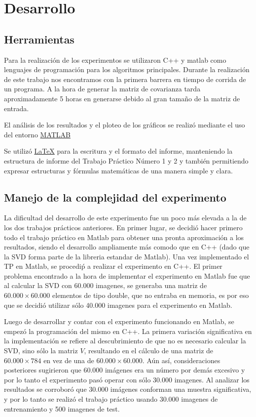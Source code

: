\section{Desarrollo}

\subsection{Herramientas}

Para la realizaci\'on de los experimentos se utilizaron C++ y matlab como lenguajes de
programaci\'on para los algoritmos principales. Durante la realizaci\'on de este trabajo nos encontramos con
la primera barrera en tiempo de corrida de un programa. A la hora de generar la matriz de covarianza tarda
aproximadamente 5 horas en generarse debido al gran tama\~no de la matriz de entrada.

El an\'alisis de los resultados y el ploteo de los gr\'aficos se realiz\'o
mediante el uso del entorno \href{http://www.matlab.com/}{MATLAB}

Se utiliz\'o \href{http://www.latex-project.org/}{\LaTeX} para la escritura y el formato del informe,
manteniendo la estructura de informe del Trabajo Pr\'actico N\'umero 1 y 2 y tambi\'en
permitiendo expresar estructuras y f\'ormulas matem\'aticas de una manera simple y clara.

\subsection{Manejo de la complejidad del experimento}

La dificultad del desarrollo de este experimento fue un poco m\'as elevada a la de los dos
trabajos pr\'acticos anteriores.
En primer lugar, se decidi\'o hacer primero todo el trabajo pr\'actico en Matlab para obtener
una pronta aproximaci\'on a los resultados, siendo el desarrollo ampliamente m\'as comodo que
en C++ (dado que la SVD forma parte de la libreria estandar de Matlab). Una vez implementado
el TP en Matlab, se procedi\'p a realizar el experimento en C++. El primer problema encontrado
a la hora de implementar el experimento en Matlab fue que al calcular la SVD con 60.000 imagenes,
se generaba una matriz de $60.000 \times 60.000$ elementos de tipo double, que no entraba en
memoria, es por eso que se decidi\'o utilizar s\'olo 40.000 imagenes para el experimento en Matlab.

Luego de desarrollar y contar con el experimento funcionando en Matlab, se empez\'o la programaci\'on
del mismo en C++. La primera variaci\'on significativa en la implementaci\'on se refiere al
descubrimiento de que no es necesario calcular la SVD, sino s\'olo la matriz $V$, resultando
en el c\'alculo de una matriz de $60.000 \times 784$ en vez de una de $60.000 \times 60.000$.
A\'un as\'i, consideraciones posteriores sugirieron que 60.000 im\'agenes era un n\'umero por
dem\'as excesivo y por lo tanto el experimento pas\'o operar con s\'olo 30.000 imagenes.
Al analizar los resultados se corrobor\'o que 30.000 im\'agenes conforman una muestra significativa,
y por lo tanto se realiz\'o el trabajo pr\'actico usando 30.000 imagenes de entrenamiento y 500 imagenes de test.

